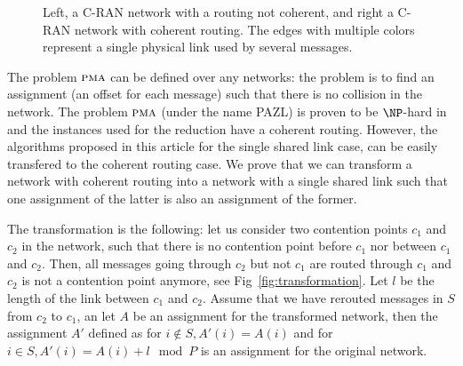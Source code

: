 \documentclass[a4paper,UKenglish,cleveref, autoref, thm-restate]{lipics-v2019}
\newcommand\pma{\textsc{pma}\xspace}
\begin{document}
\begin{figure}
\begin{center}
\begin{minipage}[c]{.45\linewidth}
{
}



\end{minipage}

 \caption{Left, a C-RAN network with a routing not coherent, and right a C-RAN network with coherent routing. The edges with multiple colors represent a single physical link used by several messages.}

\label{fig:coherent}
\end{center}
\end{figure}


The problem $\pma$ can be defined over any networks: the problem is to find an assignment (an offset for each message) such that there is no collision in the network.
The problem $\pma$ (under the name \textsc{PAZL}) is proven to be $\NP$-hard in~\cite{dominique2018deterministic} and the instances used for the reduction
have a coherent routing. However, the algorithms proposed in this article for the single shared link case, can be easily transfered to the
coherent routing case. We prove that we can transform a network with coherent routing into a network with a single shared link such that 
one assignment of the latter is also an assignment of the former.

The transformation is the following: let us consider two contention points $c_1$ and $c_2$ in the network, such that
there is no contention point before $c_1$ nor between $c_1$ and $c_2$. Then, all messages going through $c_2$ but not $c_1$ are 
routed through $c_1$ and $c_2$ is not a contention point anymore, see Fig~\ref{fig:transformation}. Let $l$ be the length of the link
between $c_1$ and $c_2$. Assume that we have rerouted messages in $S$ from $c_2$ to $c_1$, an let $A$ be an assignment for the transformed network,
then the assignment $A'$ defined as for $i\notin S, A'(i) = A(i)$ and for $i \in S, A'(i) = A(i) + l \mod P$ is an assignment for the original network.
\end{document}
